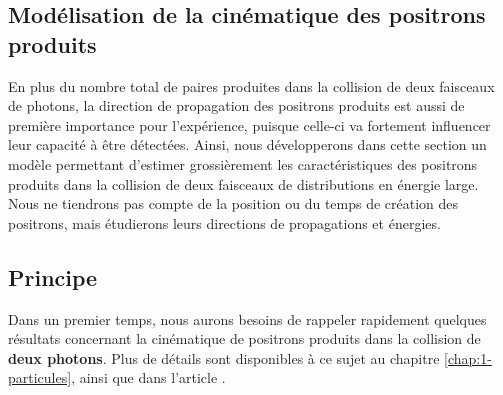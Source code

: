\begin{refsection}
\section{Modélisation de la cinématique des positrons produits}

En plus du nombre total de paires produites dans la collision de deux faisceaux de photons, la direction de propagation des positrons produits est aussi de première importance pour l'expérience, puisque celle-ci va fortement influencer leur capacité à être détectées. Ainsi, nous développerons dans cette section un modèle permettant d'estimer grossièrement les caractéristiques des positrons produits dans la collision de deux faisceaux de distributions en énergie large. Nous ne tiendrons pas compte de la position ou du temps de création des positrons, mais étudierons leurs directions de propagations et énergies.

\subsection{Principe}

Dans un premier temps, nous aurons besoins de rappeler rapidement quelques résultats concernant la cinématique de positrons produits dans la collision de \textbf{deux photons}. Plus de détails sont disponibles à ce sujet au chapitre \ref{chap:1-particules}, ainsi que dans l'article \parencite{ribeyre_2017}.


\end{refsection}
